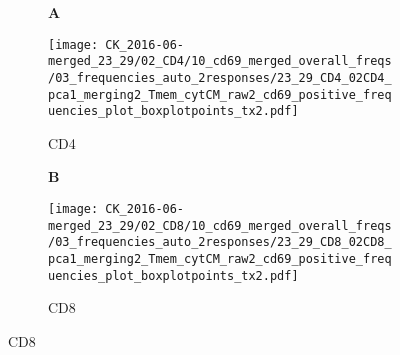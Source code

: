 \documentclass[a4paper, 12pt]{article}
\begin{document}
\begin{figure}[!thb]
\centering

    \begin{subfigure}[t]{0.02\textwidth}
    \vskip 0pt
        \textbf{\textsf{\normalsize A}}
    \end{subfigure}
    \begin{subfigure}[t]{0.45\textwidth}
    \vskip 0pt
    \caption{CD4}
        \texttt{[image: CK\_2016-06-merged\_23\_29/02\_CD4/10\_cd69\_merged\_overall\_freqs/03\_frequencies\_auto\_2responses/23\_29\_CD4\_02CD4\_pca1\_merging2\_Tmem\_cytCM\_raw2\_cd69\_positive\_frequencies\_plot\_boxplotpoints\_tx2.pdf]}
    \end{subfigure}
\quad
    \begin{subfigure}[t]{0.02\textwidth}
    \vskip 0pt
        \textbf{\textsf{\normalsize B}}
    \end{subfigure}
    \begin{subfigure}[t]{0.45\textwidth}
    \vskip 0pt
    \caption{CD8}
        \texttt{[image: CK\_2016-06-merged\_23\_29/02\_CD8/10\_cd69\_merged\_overall\_freqs/03\_frequencies\_auto\_2responses/23\_29\_CD8\_02CD8\_pca1\_merging2\_Tmem\_cytCM\_raw2\_cd69\_positive\_frequencies\_plot\_boxplotpoints\_tx2.pdf]}
    \end{subfigure}
    
    
\end{figure}
\end{document}

